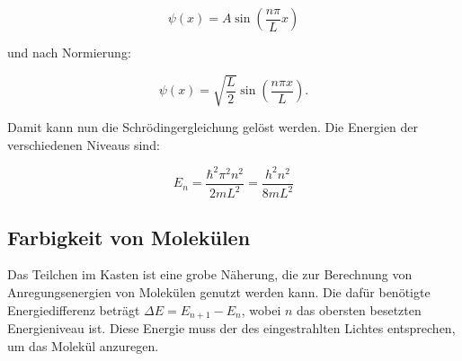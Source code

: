 \begin{equation}
\psi (x) = A \sin \left(\dfrac{n \pi}{L} x\right)
\end{equation}
    
und nach Normierung:

\begin{equation}
\psi(x)=\sqrt{\dfrac{L}{2}}\sin \left(\dfrac{n \pi x}{L}\right). 
\end{equation}


Damit kann nun die Schrödingergleichung gelöst werden. Die Energien der verschiedenen Niveaus sind: 

\begin{equation}
E_n = \frac{\hbar^2 \pi^2 n^2}{2m L^2} = \frac{h^2 n^2}{8m L^2}
\end{equation}



\subsection{Farbigkeit von Molekülen}

Das Teilchen im Kasten ist eine grobe Näherung, die zur Berechnung von Anregungsenergien von Molekülen genutzt werden kann. Die dafür benötigte Energiedifferenz beträgt $ \Delta E = E_{n+1}-E_n $, wobei $ n $ das obersten besetzten Energieniveau ist. Diese Energie muss der des eingestrahlten Lichtes entsprechen, um das Molekül anzuregen.

